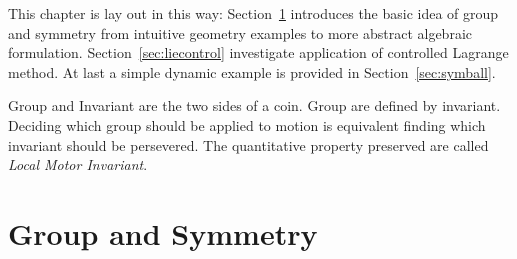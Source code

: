 This chapter is lay out in this way:
Section~\ref{sec:groupandsymmetry} introduces the basic idea of group and symmetry from intuitive geometry examples to more abstract algebraic formulation. Section~\ref{sec:liecontrol} investigate application of controlled Lagrange method.
At last a simple dynamic example is provided in Section~\ref{sec:symball}.

Group and Invariant are the two sides of a coin.
Group are defined by invariant.
Deciding which group should be applied to motion is equivalent finding which invariant should be persevered.
The quantitative property preserved are called \emph{Local Motor Invariant}.







\section{Group and Symmetry}
\label{sec:groupandsymmetry}
%
%



